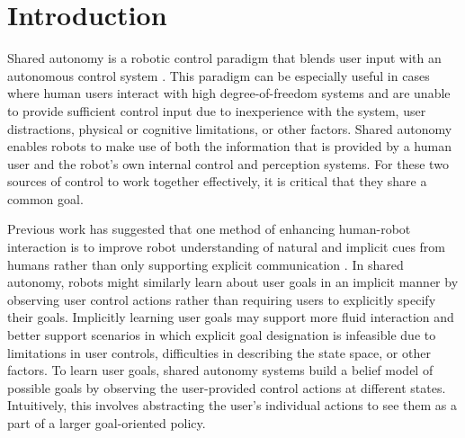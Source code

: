 \documentclass[conference]{IEEEtran}
\begin{document}
\section{Introduction}

Shared autonomy is a robotic control paradigm that blends user input with an autonomous control system \cite{dragan2012formalizing, dragan2013policy, gopinath2017human}. This paradigm can be especially useful in cases where human users interact with high degree-of-freedom systems and are unable to provide sufficient control input due to inexperience with the system, user distractions, physical or cognitive limitations, or other factors. Shared autonomy enables robots to make use of both the information that is provided by a human user and the robot's own internal control and perception systems. For these two sources of control to work together effectively, it is critical that they share a common goal.

Previous work has suggested that one method of enhancing human-robot interaction is to improve robot understanding of natural and implicit cues from humans rather than only supporting explicit communication \cite{goodrich2003seven}. In shared autonomy, robots might similarly learn about user goals in an implicit manner by observing user control actions rather than requiring users to explicitly specify their goals. Implicitly learning user goals may support more fluid interaction and better support scenarios in which explicit goal designation is infeasible due to limitations in user controls, difficulties in describing the state space, or other factors. To learn user goals, shared autonomy systems build a belief model of possible goals by observing the user-provided control actions at different states. Intuitively, this involves abstracting the user's individual actions to see them as a part of a larger goal-oriented policy.
\end{document}
